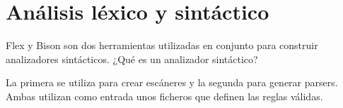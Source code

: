 \section{Análisis léxico y sintáctico}

Flex y Bison son dos herramientas utilizadas en conjunto para construir analizadores sintácticos. ¿Qué es un analizador sintáctico?

La primera se utiliza para crear escáneres y la segunda para generar parsers. Ambas utilizan como entrada unos ficheros que definen las reglas válidas.
